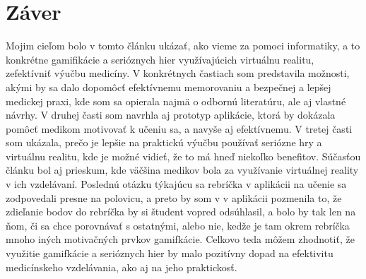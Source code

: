\documentclass[10pt,twoside,slovak,a4paper]{article}
\begin{document}
\section{Záver} \label{zaver} 
Mojim cieľom bolo v tomto článku ukázať, ako vieme za pomoci informatiky, a to konkrétne gamifikácie a serióznych hier využívajúcich virtuálnu realitu, zefektívniť výučbu medicíny. V konkrétnych častiach som predstavila možnosti, akými by sa dalo dopomôcť efektívnemu memorovaniu a bezpečnej a lepšej medickej praxi, kde som sa opierala najmä o odbornú literatúru, ale aj vlastné návrhy. V druhej časti som navrhla aj prototyp aplikácie, ktorá by dokázala pomôcť medikom motivovať k učeniu sa, a navyše aj efektívnemu. V tretej časti som ukázala, prečo je lepšie na praktickú výučbu používať seriózne hry a virtuálnu realitu, kde je možné vidieť, že to má hneď niekoľko benefitov. Súčasťou článku bol aj prieskum, kde väčšina medikov bola za využívanie virtuálnej reality v ich vzdelávaní. Poslednú otázku týkajúcu sa rebríčka v aplikácii na učenie sa zodpovedali presne na polovicu, a preto by som v v aplikácii pozmenila to, že zdieľanie bodov do rebríčka by si študent vopred odsúhlasil, a bolo by tak len na ňom, či sa chce porovnávať s ostatnými, alebo nie, kedže je tam okrem rebríčka mnoho iných motivačných prvkov gamifkácie. Celkovo teda môžem zhodnotiť, že využitie gamifkácie a serióznych hier by malo pozitívny dopad na efektivitu medicínskeho vzdelávania, ako aj na jeho praktickosť.




\end{document}
